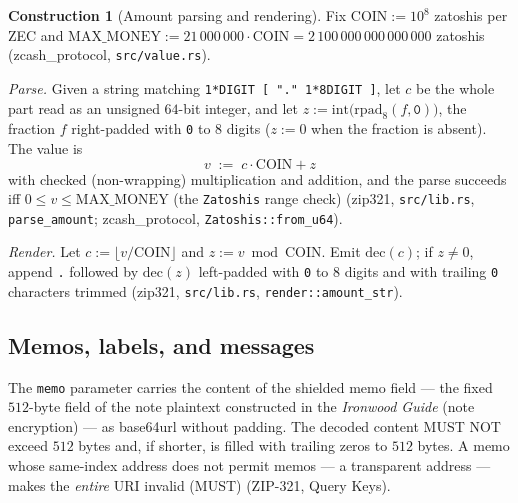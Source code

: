 \documentclass[11pt,a4paper]{article}
\theoremstyle{definition}
\newtheorem{construction}[theorem]{Construction}
\begin{document}
\begin{construction}[Amount parsing and rendering]\label{def:zip321-amount}
Fix $\mathrm{COIN} := 10^{8}$ zatoshis per ZEC and
$\mathrm{MAX\_MONEY} := 21\,000\,000 \cdot \mathrm{COIN} =
2\,100\,000\,000\,000\,000$ zatoshis
(\textsf{zcash\_protocol}, \texttt{src/value.rs}).

\emph{Parse.} Given a string matching
\texttt{1*DIGIT [ "." 1*8DIGIT ]}, let $c$ be the whole part read as an
unsigned $64$-bit integer, and let
$z := \mathrm{int}\bigl(\mathrm{rpad}_{8}(f, \mathtt{0})\bigr)$, the fraction
$f$ right-padded with \texttt{0} to $8$ digits ($z := 0$ when the fraction is
absent). The value is
\[
v \;:=\; c \cdot \mathrm{COIN} + z
\]
with checked (non-wrapping) multiplication and addition, and the parse
succeeds iff $0 \le v \le \mathrm{MAX\_MONEY}$ (the \texttt{Zatoshis}
range check) (\textsf{zip321}, \texttt{src/lib.rs}, \texttt{parse\_amount};
\textsf{zcash\_protocol}, \texttt{Zatoshis::from\_u64}).

\emph{Render.} Let $c := \lfloor v / \mathrm{COIN} \rfloor$ and
$z := v \bmod \mathrm{COIN}$. Emit $\mathrm{dec}(c)$; if $z \neq 0$, append
\texttt{.} followed by $\mathrm{dec}(z)$ left-padded with \texttt{0} to $8$
digits and with trailing \texttt{0} characters trimmed
(\textsf{zip321}, \texttt{src/lib.rs}, \texttt{render::amount\_str}).
\end{construction}

\subsection{Memos, labels, and messages}\label{sec:zip321-memo}

The \texttt{memo} parameter carries the content of the shielded memo field
--- the fixed $512$-byte field of the note plaintext constructed in the
\emph{Ironwood Guide} (note encryption) --- as base64url without padding.
The decoded content MUST NOT exceed $512$ bytes and, if shorter, is filled
with trailing zeros to $512$ bytes. A memo whose same-index address does not
permit memos --- a transparent address --- makes the \emph{entire} URI
invalid (MUST) (ZIP-321, Query Keys).
\end{document}
